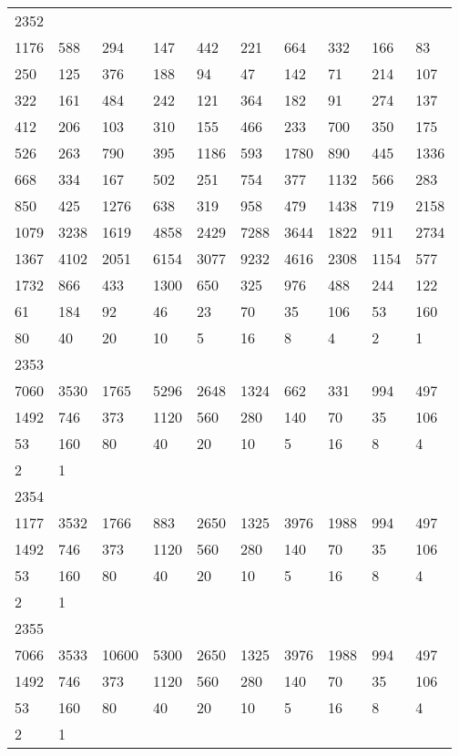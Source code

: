 \begin{longtable}{*{10}{l}}
2352&&&&&&&&&\\
1176& 588& 294& 147& 442& 221& 664& 332& 166& 83\\
250& 125& 376& 188& 94& 47& 142& 71& 214& 107\\
322& 161& 484& 242& 121& 364& 182& 91& 274& 137\\
412& 206& 103& 310& 155& 466& 233& 700& 350& 175\\
526& 263& 790& 395& 1186& 593& 1780& 890& 445& 1336\\
668& 334& 167& 502& 251& 754& 377& 1132& 566& 283\\
850& 425& 1276& 638& 319& 958& 479& 1438& 719& 2158\\
1079& 3238& 1619& 4858& 2429& 7288& 3644& 1822& 911& 2734\\
1367& 4102& 2051& 6154& 3077& 9232& 4616& 2308& 1154& 577\\
1732& 866& 433& 1300& 650& 325& 976& 488& 244& 122\\
61& 184& 92& 46& 23& 70& 35& 106& 53& 160\\
80& 40& 20& 10& 5& 16& 8& 4& 2& 1\\

2353&&&&&&&&&\\
7060& 3530& 1765& 5296& 2648& 1324& 662& 331& 994& 497\\
1492& 746& 373& 1120& 560& 280& 140& 70& 35& 106\\
53& 160& 80& 40& 20& 10& 5& 16& 8& 4\\
2& 1& \\

2354&&&&&&&&&\\
1177& 3532& 1766& 883& 2650& 1325& 3976& 1988& 994& 497\\
1492& 746& 373& 1120& 560& 280& 140& 70& 35& 106\\
53& 160& 80& 40& 20& 10& 5& 16& 8& 4\\
2& 1& \\

2355&&&&&&&&&\\
7066& 3533& 10600& 5300& 2650& 1325& 3976& 1988& 994& 497\\
1492& 746& 373& 1120& 560& 280& 140& 70& 35& 106\\
53& 160& 80& 40& 20& 10& 5& 16& 8& 4\\
2& 1& \\


\end{longtable}
